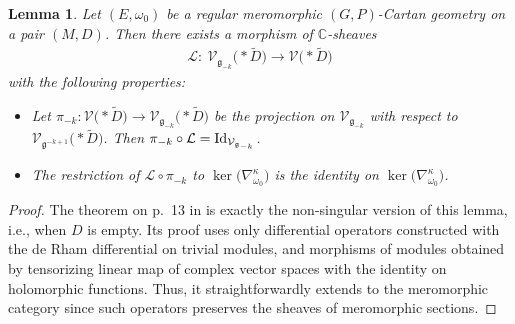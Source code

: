 \documentclass[10pt,a4paper]{amsart}
\numberwithin{equation}{section}
\newtheorem{Lemma}[Theorem]{Lemma}
\begin{document}
\begin{Lemma}\label{caractersiticparabolic} Let $(E,\omega_0)$ be a regular meromorphic $(G,P)$-Cartan geometry on a pair $(M,D)$. Then there exists a morphism of $\mathbb{C}$-sheaves
\begin{gather*}%
 \mathcal{L} \colon\ \mathcal{V}_{\mathfrak{g}_{-k}}\bigl(* \tilde{D}\bigr) \longrightarrow \mathcal{V}\bigl(* \tilde{D}\bigr) \end{gather*}
 with the following properties:
\begin{itemize}\itemsep=0pt
 \item[$(i)$] Let $\pi_{-k}\colon \mathcal{V}\bigl(* \tilde{D}\bigr) \longrightarrow \mathcal{V}_{\mathfrak{g}_{-k}}\bigl(* \tilde{D}\bigr)$ be the projection on $\mathcal{V}_{\mathfrak{g}_{-k}}$ with respect to $\mathcal{V}_{\mathfrak{g}^{-k+1}}\bigl(* \tilde{D}\bigr)$. Then $\pi_{-k}\circ \mathcal{L} = {\rm Id}_{\mathcal{V}_{\mathfrak{g}_{-k}}}$.
\item[$(ii)$] The restriction of $\mathcal{L}\circ \pi_{-k}$ to $\ker\big(\nabla^\kappa_{\omega_0}\big)$ is the identity on $\ker\big(\nabla^\kappa_{\omega_0}\big)$.
\end{itemize}\end{Lemma}
\begin{proof} The theorem on p.~13 in \cite{Cap4} is exactly the non-singular version of this lemma, i.e., when $D$ is empty. Its proof uses only differential operators constructed with the de Rham differential on trivial modules, and morphisms of modules obtained by tensorizing linear map of complex vector spaces with the identity on holomorphic functions. Thus, it straightforwardly extends to the meromorphic category since such operators preserves the sheaves of meromorphic sections. \end{proof}
\end{document}
